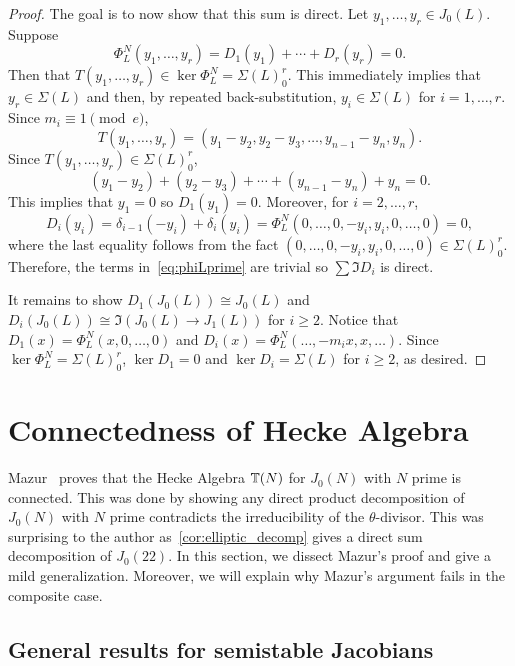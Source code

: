 \documentclass[11pt, proquest]{uwthesis}
\begin{document}
\begin{proof}
    The goal is to now show that this sum is direct. Let $y_1,\ldots,y_r\in
    J_0(L)$. Suppose
    \begin{equation}
        \label{eq:phiLprime}
        \Phi_L ^N (y_1,\ldots,y_r) =D_1(y_1)+ \cdots +D_r(y_r)=0.
    \end{equation}
    Then that $T(y_1,\ldots,y_r)\in \ker\Phi_L ^N=\Sigma(L)_0 ^r$.  This
    immediately implies that $y_r\in \Sigma(L)$ and then, by repeated
    back-substitution, $y_i\in \Sigma(L)$ for $i=1,\ldots,r$. Since $m_i \equiv
    1 \pmod{e}$,
    \[
        T(y_1,\ldots,y_r)=(y_1-y_2,y_2-y_3,\ldots,y_{n-1}-y_n,y_n).
    \]
    Since $T(y_1,\ldots,y_r)\in \Sigma(L)_0 ^r$,
    \[
        (y_1-y_2)+(y_2-y_3)+\cdots+(y_{n-1}-y_n)+y_n =0.
    \]
    This implies that $y_1=0$ so $D_1(y_1)=0$. Moreover, for $i=2,\ldots,r$,
    \begin{equation*}
        D_i(y_i)
            = \delta_{i-1}(-y_i) + \delta_i (y_i)
            = \Phi_L ^N (0,\ldots,0,-y_i,y_i,0,\ldots,0)
            = 0,
    \end{equation*}
    where the last equality follows from the fact
    $(0,\ldots,0,-y_i,y_i,0,\ldots,0)\in \Sigma(L)_0 ^r$. Therefore, the terms
    in~\eqref{eq:phiLprime} are trivial so $\sum \Im D_i$ is direct.

    It remains to show $D_1(J_0(L))\cong J_0(L)$ and $D_i(J_0(L))\cong
    \Im(J_0(L)\to J_1(L))$ for $i\geq 2$. Notice that
    $D_1(x)=\Phi_L ^N(x,0,\ldots,0)$ and $D_i(x)=\Phi_L ^N(\ldots,-m_ix,x,\ldots)$.
    Since $\ker\Phi_L ^N=\Sigma(L)_0 ^r$, $\ker D_1=0$ and $\ker D_i=\Sigma(L)$
    for $i\geq 2$, as desired.
\end{proof}


\section{Connectedness of Hecke Algebra}%
\label{sec:connectedness_of_hecke_algebra}

Mazur~\cite[Prop. 10.6]{mazur:eisenstein} proves that the Hecke Algebra
$\mathbb{T}(N)$ for $J_0(N)$ with $N$ prime is connected. This was done by showing any
direct product decomposition of $J_0(N)$ with $N$ prime contradicts the
irreducibility of the $\theta$-divisor. This was surprising to the author
as~\ref{cor:elliptic_decomp} gives a direct sum decomposition of $J_0(22)$. In
this section, we dissect Mazur's proof and give a mild generalization.
Moreover, we will explain why Mazur's argument fails in the composite case.

\subsection{General results for semistable Jacobians}
\end{document}
